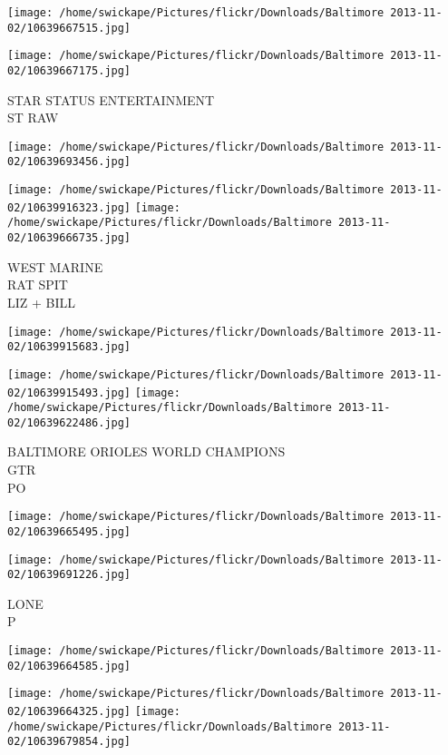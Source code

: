 \documentclass[10pt,letterpaper]{article}
\begin{document}
\texttt{[image: /home/swickape/Pictures/flickr/Downloads/Baltimore 2013-11-02/10639667515.jpg]}

\vspace{0.25in}
\texttt{[image: /home/swickape/Pictures/flickr/Downloads/Baltimore 2013-11-02/10639667175.jpg]}

STAR STATUS ENTERTAINMENT\\
ST RAW
\pagebreak

\texttt{[image: /home/swickape/Pictures/flickr/Downloads/Baltimore 2013-11-02/10639693456.jpg]}

\vspace{0.25in}
\texttt{[image: /home/swickape/Pictures/flickr/Downloads/Baltimore 2013-11-02/10639916323.jpg]}
\texttt{[image: /home/swickape/Pictures/flickr/Downloads/Baltimore 2013-11-02/10639666735.jpg]}

WEST MARINE\\
RAT SPIT\\
LIZ + BILL
\pagebreak

\texttt{[image: /home/swickape/Pictures/flickr/Downloads/Baltimore 2013-11-02/10639915683.jpg]}

\vspace{0.25in}
\texttt{[image: /home/swickape/Pictures/flickr/Downloads/Baltimore 2013-11-02/10639915493.jpg]}
\texttt{[image: /home/swickape/Pictures/flickr/Downloads/Baltimore 2013-11-02/10639622486.jpg]}

BALTIMORE ORIOLES WORLD CHAMPIONS\\
GTR\\
PO
\pagebreak

\texttt{[image: /home/swickape/Pictures/flickr/Downloads/Baltimore 2013-11-02/10639665495.jpg]}

\vspace{0.25in}
\texttt{[image: /home/swickape/Pictures/flickr/Downloads/Baltimore 2013-11-02/10639691226.jpg]}

LONE\\
P
\pagebreak

\texttt{[image: /home/swickape/Pictures/flickr/Downloads/Baltimore 2013-11-02/10639664585.jpg]}

\vspace{0.25in}
\texttt{[image: /home/swickape/Pictures/flickr/Downloads/Baltimore 2013-11-02/10639664325.jpg]}
\texttt{[image: /home/swickape/Pictures/flickr/Downloads/Baltimore 2013-11-02/10639679854.jpg]}
\end{document}
